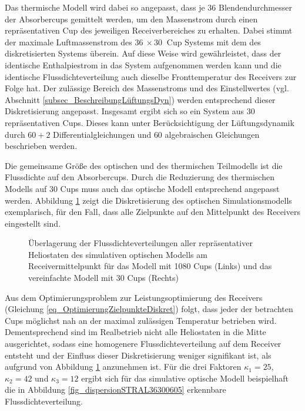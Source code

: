 Das thermische Modell wird dabei so angepasst, dass je $36$ Blendendurchmesser der Absorbercups gemittelt werden, um den Massenstrom durch einen repräsentativen Cup des jeweiligen Receiverbereiches zu erhalten.
Dabei stimmt der maximale Luftmassenstrom des $\SI{36}{} \times \SI{30}{}$ Cup Systems mit dem des diskretisierten Systems überein.
Auf diese Weise wird gewährleistet, dass der identische Enthalpiestrom in das System aufgenommen werden kann und die identische Flussdichteverteilung auch dieselbe Fronttemperatur des Receivers zur Folge hat.
Der zulässige Bereich des Massenstroms und des Einstellwertes (vgl. Abschnitt \ref{subsec_BeschreibungLüftungsDyn}) werden entsprechend dieser Diskretisierung angepasst.
Insgesamt ergibt sich so ein System aus $30$ repräsentativen Cups.
Dieses kann unter Berücksichtigung der Lüftungsdynamik durch $60+2$ Differentialgleichungen und $60$ algebraischen Gleichungen beschrieben werden.

Die gemeinsame Größe des optischen und des thermischen Teilmodells ist die Flussdichte auf den Absorbercups.
Durch die Reduzierung des thermischen Modells auf $30$ Cups muss auch das optische Modell entsprechend angepasst werden.
Abbildung \ref{fig_statischerZielpunkt363065} zeigt die Diskretisierung des optischen Simulationsmodells exemplarisch, für den Fall, dass alle Zielpunkte auf den Mittelpunkt des Receivers eingestellt sind. \pagebreak

\begin{figure}[h!]
    \centering
    \setlength{\fboxsep}{1pt}
    \setlength{\fboxrule}{1pt}
    \caption[Überlagerung der Flussdichteverteilungen aller repräsentativer Heliostaten des simulativen optischen Modells am Receivermittelpunkt für das Modell mit 1080 Cups und das vereinfachte Modell mit 30 Cups]{Überlagerung der Flussdichteverteilungen aller repräsentativer Heliostaten des simulativen optischen Modells am Receivermittelpunkt für das Modell mit 1080 Cups (Links) und das vereinfachte Modell mit 30 Cups (Rechts)}
    \label{fig_statischerZielpunkt363065}
\end{figure}

Aus dem Optimierungsproblem zur Leistungsoptimierung des Receivers (Gleichung \ref{eq_OptimierungZielpunkteDiskret}) folgt, dass jeder der betrachten Cups möglichst nah an der maximal zulässigen Temperatur betrieben wird.
Dementsprechend sind im Realbetrieb nicht alle Heliostaten in die Mitte ausgerichtet, sodass eine homogenere Flussdichteverteilung auf dem Receiver entsteht und der Einfluss dieser Diskretisierung weniger signifikant ist, als aufgrund von Abbildung \ref{fig_statischerZielpunkt363065} anzunehmen ist.
Für die drei Faktoren $\kappa_1 = 25$, $\kappa_2 = 42$ und $\kappa_3 = 12$ ergibt sich für das simulative optische Modell beispielhaft die in Abbildung \ref{fig_dispersionSTRAL36300605} erkennbare Flussdichteverteilung.

